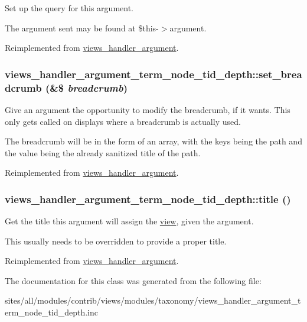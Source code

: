 Set up the query for this argument.

The argument sent may be found at \$this-$>$argument. 

Reimplemented from \hyperlink{classviews__handler__argument_c4b0ce6704a10f515b2aea2f9e790994}{views\_\-handler\_\-argument}.\hypertarget{classviews__handler__argument__term__node__tid__depth_4cbf578a06b12655b9a5aa8fcee4097d}{
\subsubsection[{set\_\-breadcrumb}]{\setlength{\rightskip}{0pt plus 5cm}views\_\-handler\_\-argument\_\-term\_\-node\_\-tid\_\-depth::set\_\-breadcrumb (\&\$ {\em breadcrumb})}}
\label{classviews__handler__argument__term__node__tid__depth_4cbf578a06b12655b9a5aa8fcee4097d}


Give an argument the opportunity to modify the breadcrumb, if it wants. This only gets called on displays where a breadcrumb is actually used.

The breadcrumb will be in the form of an array, with the keys being the path and the value being the already sanitized title of the path. 

Reimplemented from \hyperlink{classviews__handler__argument_06263489052be463efd3c4afdf73851d}{views\_\-handler\_\-argument}.\hypertarget{classviews__handler__argument__term__node__tid__depth_d5a2ca190b4b164a810f84f808faa586}{
\subsubsection[{title}]{\setlength{\rightskip}{0pt plus 5cm}views\_\-handler\_\-argument\_\-term\_\-node\_\-tid\_\-depth::title ()}}
\label{classviews__handler__argument__term__node__tid__depth_d5a2ca190b4b164a810f84f808faa586}


Get the title this argument will assign the \hyperlink{classview}{view}, given the argument.

This usually needs to be overridden to provide a proper title. 

Reimplemented from \hyperlink{classviews__handler__argument_76181ac24e7be4a09aaafc1fa5f15ea1}{views\_\-handler\_\-argument}.

The documentation for this class was generated from the following file:\begin{CompactItemize}
\item 
sites/all/modules/contrib/views/modules/taxonomy/views\_\-handler\_\-argument\_\-term\_\-node\_\-tid\_\-depth.inc\end{CompactItemize}
